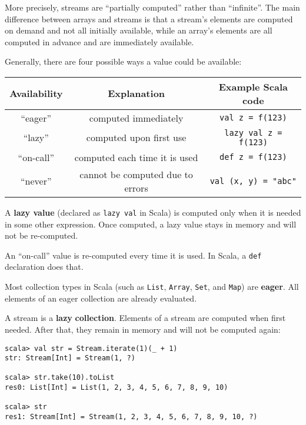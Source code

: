 More precisely, streams are \textsf{``}partially computed\textsf{''} rather than \textsf{``}infinite\textsf{''}.
The main difference between arrays and streams is that a stream\textsf{'}s
elements are computed on demand and not all initially available, while
an array\textsf{'}s elements are all computed in advance and are immediately
available.

Generally, there are four possible ways a value could be available:
\begin{center}
\begin{tabular}{|c|c|c|}
\hline 
\textbf{\small{}Availability} & \textbf{\small{}Explanation} & \textbf{\small{}Example Scala code}\tabularnewline
\hline 
\hline 
{\small{}\textsf{``}eager\index{eager value}\textsf{''}} & {\small{}computed immediately} & {\small{}}\lstinline!val z = f(123)!\tabularnewline
\hline 
{\small{}\textsf{``}lazy\textsf{''}} & {\small{}computed upon first use} & {\small{}}\lstinline!lazy val z = f(123)!\tabularnewline
\hline 
{\small{}\textsf{``}on-call\textsf{''}} & {\small{}computed each time it is used} & {\small{}}\lstinline!def z = f(123)!\tabularnewline
\hline 
{\small{}\textsf{``}never\textsf{''}} & {\small{}cannot be computed due to errors} & {\small{}}\lstinline!val (x, y) = "abc" !\tabularnewline
\hline 
\end{tabular}
\par\end{center}

A \textbf{lazy value} (declared as \lstinline!lazy val!
in Scala) is computed only when it is needed in some other expression.
Once computed, a lazy value stays in memory and will not be re-computed.

An \textsf{``}on-call\textsf{''} value is re-computed every
time it is used. In Scala, a \lstinline!def! declaration does that.

Most collection types in Scala (such as \lstinline!List!, \lstinline!Array!,
\lstinline!Set!, and \lstinline!Map!) are \textbf{eager}.
All elements of an eager collection are already evaluated.

A stream is a \textbf{lazy} \textbf{collection}.
Elements of a stream are computed when first needed. After that, they
remain in memory and will not be computed again:
\begin{lstlisting}
scala> val str = Stream.iterate(1)(_ + 1)
str: Stream[Int] = Stream(1, ?)

scala> str.take(10).toList
res0: List[Int] = List(1, 2, 3, 4, 5, 6, 7, 8, 9, 10)

scala> str
res1: Stream[Int] = Stream(1, 2, 3, 4, 5, 6, 7, 8, 9, 10, ?)
\end{lstlisting}

